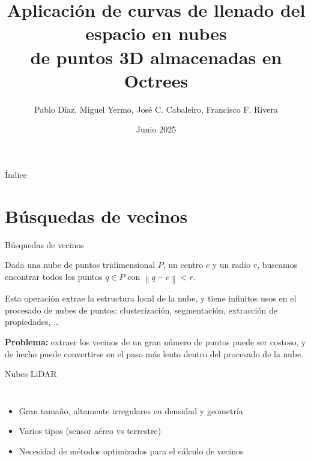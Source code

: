 \documentclass[aspectratio=169]{beamer}
\title{Aplicación de curvas de llenado del espacio en nubes \\ de puntos 3D almacenadas en Octrees}
\author{Pablo Díaz, Miguel Yermo, José C. Cabaleiro, Francisco F. Rivera}
\date{Junio 2025}
\def\toctitle{Índice}
\begin{document}
\begin{frame}[plain]%
    \titlepage%
    
\end{frame}
  
\begin{frame}[plain]{\toctitle}
    \tableofcontents
\end{frame}
\setcounter{framenumber}{0} %

\section{Búsquedas de vecinos}

\begin{frame}{Búsquedas de vecinos}

Dada una nube de puntos tridimensional $P$, un centro $c$ y un radio $r$, buscamos encontrar todos los puntos $q \in P$ con $\left\lVert q-c \right\rVert < r$.

Esta operación extrae la estructura local de la nube, y tiene infinitos usos en el procesado de nubes de puntos: clusterización, segmentación, extracción de propiedades, \dots
\vspace{2em}

\textbf{Problema:} extraer los vecinos de un gran número de puntos puede ser costoso, y de hecho puede convertirse en el paso más lento dentro del procesado de la nube.
\end{frame}

\begin{frame}{Nubes LiDAR}
    \begin{columns}
            \begin{itemize}
                \item Gran tamaño, altamente irregulares en densidad y geometría
                \item Varios tipos (sensor aéreo vs terrestre)
                \item Necesidad de métodos optimizados para el cálculo de vecinos
            \end{itemize}        
        \end{columns}
\end{frame}
\end{document}

